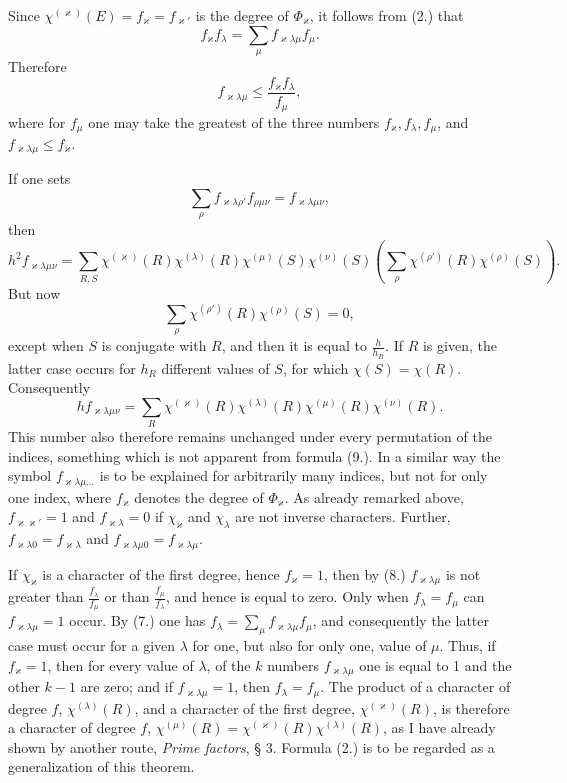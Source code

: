 \documentclass[11pt]{article}
\begin{document}
Since $\chi^{(\varkappa)}(E)=f_\varkappa=f_{\varkappa'}$ is the degree of $\Phi_\varkappa$, it follows from (2.) that
\begin{equation*}\tag{7.}
f_\varkappa f_\lambda=\sum_\mu f_{\varkappa\lambda\mu}f_\mu.
\end{equation*}
Therefore
\begin{equation*}\tag{8.}
f_{\varkappa\lambda\mu}\leq \frac{f_\varkappa f_\lambda}{f_\mu},
\end{equation*}
where for $f_\mu$ one may take the greatest of the three numbers $f_\varkappa,f_\lambda,f_\mu$, and $f_{\varkappa\lambda\mu}\leq f_\varkappa$.

If one sets
\begin{equation*}\tag{9.}
\sum_\rho f_{\varkappa\lambda\rho'}f_{\rho\mu\nu}=f_{\varkappa\lambda\mu\nu},
\end{equation*}
then
\[
h^2 f_{\varkappa\lambda\mu\nu}
=\sum_{R,S}\chi^{(\varkappa)}(R)\chi^{(\lambda)}(R)\chi^{(\mu)}(S)\chi^{(\nu)}(S)
\left(\sum_\rho\chi^{(\rho')}(R)\chi^{(\rho)}(S)\right).
\]
But now
\[
\sum_\rho\chi^{(\rho')}(R)\chi^{(\rho)}(S)=0,
\]
except when $S$ is conjugate with $R$, and then it is equal to $\frac{h}{h_R}$. If $R$ is given, the latter case occurs for $h_R$ different values of $S$, for which $\chi(S)=\chi(R)$. Consequently
\begin{equation*}\tag{10.}
h f_{\varkappa\lambda\mu\nu}
=\sum_R \chi^{(\varkappa)}(R)\chi^{(\lambda)}(R)\chi^{(\mu)}(R)\chi^{(\nu)}(R).
\end{equation*}
This number also therefore remains unchanged under every permutation of the indices, something which is not apparent from formula (9.). In a similar way the symbol $f_{\varkappa\lambda\mu\ldots}$ is to be explained for arbitrarily many indices, but not for only one index, where $f_\varkappa$ denotes the degree of $\Phi_\varkappa$. As already remarked above, $f_{\varkappa\varkappa'}=1$ and $f_{\varkappa\lambda}=0$ if $\chi_\varkappa$ and $\chi_\lambda$ are not inverse characters. Further, $f_{\varkappa\lambda 0}=f_{\varkappa\lambda}$ and $f_{\varkappa\lambda\mu0}=f_{\varkappa\lambda\mu}$.

If $\chi_\varkappa$ is a character of the first degree, hence $f_\varkappa=1$, then by (8.) $f_{\varkappa\lambda\mu}$ is not greater than $\frac{f_\lambda}{f_\mu}$ or than $\frac{f_\mu}{f_\lambda}$, and hence is equal to zero. Only when $f_\lambda=f_\mu$ can $f_{\varkappa\lambda\mu}=1$ occur. By (7.) one has $f_\lambda=\sum_\mu f_{\varkappa\lambda\mu}f_\mu$, and consequently the latter case must occur for a given $\lambda$ for one, but also for only one, value of $\mu$. Thus, if $f_\varkappa=1$, then for every value of $\lambda$, of the $k$ numbers $f_{\varkappa\lambda\mu}$ one is equal to 1 and the other $k-1$ are zero; and if $f_{\varkappa\lambda\mu}=1$, then $f_\lambda=f_\mu$. The product of a character of degree $f$, $\chi^{(\lambda)}(R)$, and a character of the first degree, $\chi^{(\varkappa)}(R)$, is therefore a character of degree $f$, $\chi^{(\mu)}(R)=\chi^{(\varkappa)}(R)\chi^{(\lambda)}(R)$, as I have already shown by another route, \emph{Prime factors}, § 3. Formula (2.) is to be regarded as a generalization of this theorem.
\end{document}
